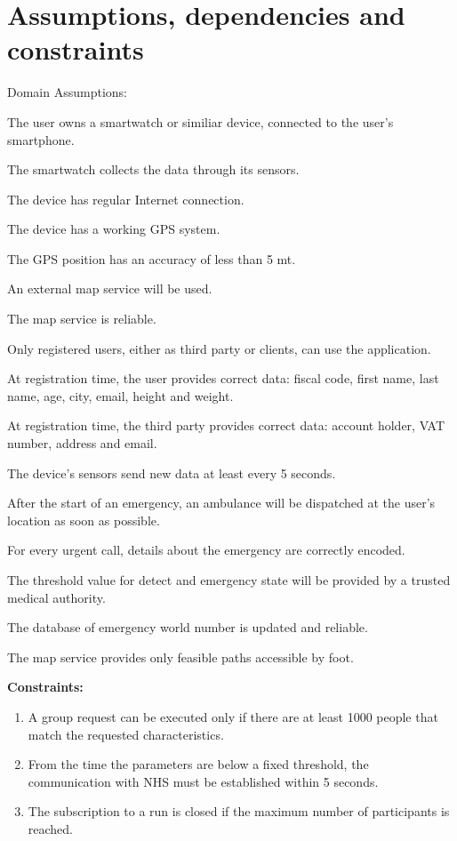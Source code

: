 \section{Assumptions, dependencies and constraints}
Domain Assumptions:
\begin{enumerate}[label={[}D.\arabic*{]}]

\item \label{d:1}
The user owns a smartwatch or similiar device, connected to the user’s smartphone.
\item\label{d:2}
The smartwatch collects the data through its sensors.
\item\label{d:3}
The device has regular Internet connection.
\item\label{d:4}
The device has a working GPS system.
\item\label{d:4}
The GPS position has an accuracy of less than 5 mt.
\item\label{d:5}
An external map service will be used.
\item\label{d:6}
The map service is reliable.
\item\label{d:7}
Only registered users, either as third party or clients, can use the application.
\item\label{d:8}
At registration time, the user provides correct data: fiscal code, first name, last name, age, city, email, height and weight.
\item\label{d:08}
At registration time, the third party provides correct data: account holder, VAT number, address and email.
\item\label{d:9}
The device’s sensors send new data at least every 5 seconds.
\item\label{d:10}
After the start of an emergency, an ambulance will be dispatched at the user’s location as soon as possible.
\item\label{d:11}
For every urgent call, details about the emergency are correctly encoded.
\item\label{d:12}
The threshold value for detect and emergency state will be provided by a trusted medical authority.
\item\label{d:13}
The database of emergency world number is updated and reliable.
\item\label{d:14}
The map service provides only feasible paths accessible by foot.
\end{enumerate}
\newpage
\textbf{Constraints:}

\begin{enumerate}
    \item\label{c:1}	A group request can be executed only if there are at least 1000 people that match the requested characteristics.
    \item\label{c:2}
    From the time the parameters are below a fixed threshold, the communication with NHS must be established within 5 seconds.
    \item\label{c:3}
    The subscription to a run is closed if the maximum number of participants is reached.
\end{enumerate}



